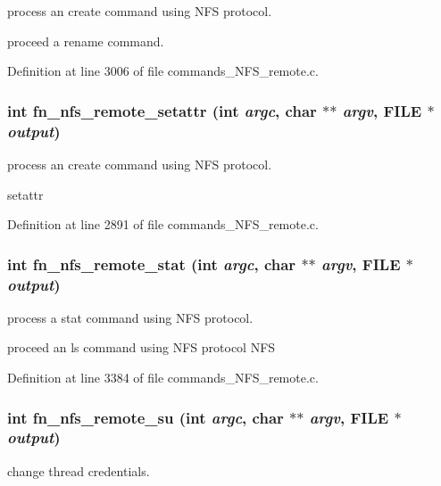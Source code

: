process an create command using NFS protocol.

proceed a rename command. 

Definition at line 3006 of file commands\_\-NFS\_\-remote.c.
\subsubsection[{fn\_\-nfs\_\-remote\_\-setattr}]{\setlength{\rightskip}{0pt plus 5cm}int fn\_\-nfs\_\-remote\_\-setattr (int {\em argc}, \/  char $\ast$$\ast$ {\em argv}, \/  FILE $\ast$ {\em output})}\label{commands_8h_6cd8456d9ed8ef731cb45ccb4168847a}


process an create command using NFS protocol.

setattr 

Definition at line 2891 of file commands\_\-NFS\_\-remote.c.
\subsubsection[{fn\_\-nfs\_\-remote\_\-stat}]{\setlength{\rightskip}{0pt plus 5cm}int fn\_\-nfs\_\-remote\_\-stat (int {\em argc}, \/  char $\ast$$\ast$ {\em argv}, \/  FILE $\ast$ {\em output})}\label{commands_8h_a1c93ad1ec1bd3c6b83787fbf3983a1f}


process a stat command using NFS protocol.

proceed an ls command using NFS protocol NFS 

Definition at line 3384 of file commands\_\-NFS\_\-remote.c.
\subsubsection[{fn\_\-nfs\_\-remote\_\-su}]{\setlength{\rightskip}{0pt plus 5cm}int fn\_\-nfs\_\-remote\_\-su (int {\em argc}, \/  char $\ast$$\ast$ {\em argv}, \/  FILE $\ast$ {\em output})}\label{commands_8h_7e50bf8f40b54033ee4afb6055b2aac2}


change thread credentials. 

